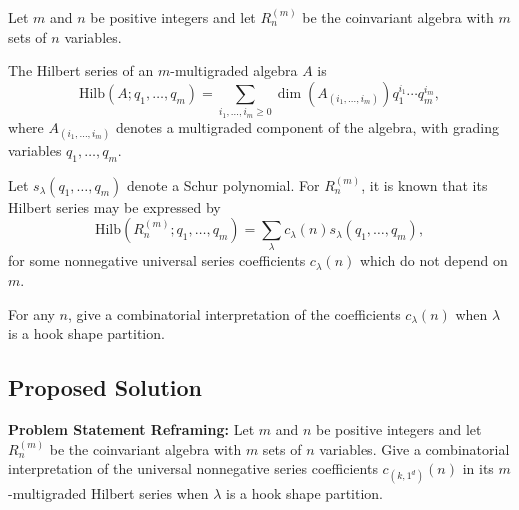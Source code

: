 \documentclass[12pt]{article}
\begin{document}
Let $m$ and $n$ be positive integers and let $R_n^{(m)}$ be the coinvariant algebra with $m$ sets of $n$ variables.

The Hilbert series of an $m$-multigraded algebra $A$ is
\[
\mathrm{Hilb}(A;q_1,\ldots ,q_m)= \sum_{i_1,\ldots,i_m \geq 0} \dim(A_{(i_1,\ldots,i_m)})q_1^{i_1} \cdots q_m^{i_m},
\]
where $A_{(i_1,\ldots,i_m)}$ denotes a multigraded component of the algebra, with grading variables $q_1,\ldots, q_m$.

Let $s_\lambda(q_1,\ldots ,q_m)$ denote a Schur polynomial. For $R_n^{(m)}$, it is known that its Hilbert series may be expressed by 
\[
\mathrm{Hilb}(R_n^{(m)};q_1,\ldots ,q_m)= \sum_{\lambda}
c_{\lambda}(n)s_\lambda(q_1,\ldots ,q_m),
\]
for some nonnegative universal series coefficients $c_\lambda(n)$ which do not depend on $m$.

For any $n$, give a combinatorial interpretation of the coefficients $c_{\lambda}(n)$ when $\lambda$ is a hook shape partition.

\subsection*{Proposed Solution}

\textbf{Problem Statement Reframing:} Let $m$ and $n$ be positive integers and let $R_n^{(m)}$ be the coinvariant algebra with $m$ sets of $n$ variables. Give a combinatorial interpretation of the universal nonnegative series coefficients $c_{(k, 1^d)}(n)$ in its $m$-multigraded Hilbert series when $\lambda$ is a hook shape partition.
\end{document}
